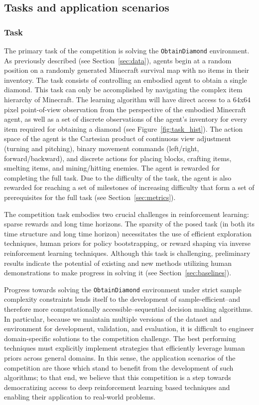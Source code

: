 \subsection{Tasks and application scenarios}


\subsubsection{Task}
    
The primary task of the competition is solving the \texttt{ObtainDiamond} environment. 
As previously described (see Section~\ref{sec:data}), agents begin at a random position on a randomly generated Minecraft survival map with no items in their inventory. 
The task consists of controlling an embodied agent to obtain a single diamond.
This task can only be accomplished by navigating the complex item hierarchy of Minecraft. 
The learning algorithm will have direct access to a $64$x$64$ pixel point-of-view observation from the perspective of the embodied Minecraft agent, as well as a set of discrete observations of the agent's inventory for every item required for obtaining a diamond (see Figure~\ref{fig:task_hist}). 
The action space of the agent is the Cartesian product of continuous view adjustment (turning and pitching), binary movement commands (left/right, forward/backward), and discrete actions for placing blocks, crafting items, smelting items, and mining/hitting enemies.  
The agent is rewarded for completing the full task.
Due to the difficulty of the task, the agent is also rewarded for reaching a set of milestones of increasing difficulty that form a set of prerequisites for the full task (see Section~\ref{sec:metrics}).

The competition task embodies two crucial challenges in reinforcement learning: sparse rewards and long time horizons. 
The sparsity of the posed task (in both its time structure and long time horizon) necessitates the use of efficient exploration techniques, human priors for policy bootstrapping, or reward shaping via inverse reinforcement learning techniques. 
Although this task is challenging, preliminary results indicate the potential of existing and new methods utilizing human demonstrations to make progress in solving it (see Section~\ref{sec:baselines}).
    
Progress towards solving the \texttt{ObtainDiamond} environment under strict sample complexity constraints lends itself to the development of sample-efficient--and therefore more computationally accessible--sequential decision making algorithms. 
In particular, because we maintain multiple versions of the dataset and environment for development, validation, and evaluation, it is difficult to engineer domain-specific solutions to the competition challenge. 
The best performing techniques must explicitly implement strategies that efficiently leverage human priors across general domains. 
In this sense, the application scenarios of the competition are those which stand to benefit from the development of such algorithms; to that end, we believe that this competition is a step towards democratizing access to deep reinforcement learning based techniques and enabling their application to real-world problems.
    
